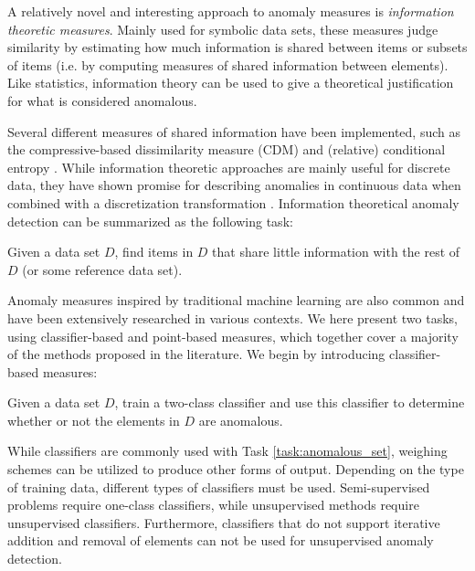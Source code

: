 A relatively novel and interesting approach to anomaly measures is \emph{information theoretic measures}. Mainly used for symbolic data sets, these measures judge similarity by estimating how much information is shared between items or subsets of items (i.e. by computing measures of shared information between elements). Like statistics, information theory can be used to give a theoretical justification for what is considered anomalous.

Several different measures of shared information have been implemented, such as the compressive-based dissimilarity measure (CDM) \cite{keogh2} and (relative) conditional entropy \cite{xiang}. While information theoretic approaches are mainly useful for discrete data, they have shown promise for describing anomalies in continuous data when combined with a discretization transformation \cite{keogh2}. Information theoretical anomaly detection can be summarized as the following task:

\begin{task}
  Given a data set $D$, find items in $D$ that share little information with the rest of $D$ (or some reference data set).
\end{task}

Anomaly measures inspired by traditional machine learning are also common and have been extensively researched in various contexts. We here present two tasks, using classifier-based and point-based measures, which together cover a majority of the methods proposed in the literature. We begin by introducing classifier-based measures:

\begin{task}
  Given a data set $D$, train a two-class classifier and use this classifier to determine whether or not the elements in $D$ are anomalous.
\end{task}
 
While classifiers are commonly used with Task \ref{task:anomalous_set}, weighing schemes can be utilized to produce other forms of output. Depending on the type of training data, different types of classifiers must be used. Semi-supervised problems require one-class classifiers, while unsupervised methods require unsupervised classifiers. Furthermore, classifiers that do not support iterative addition and removal of elements can not be used for unsupervised anomaly detection.

